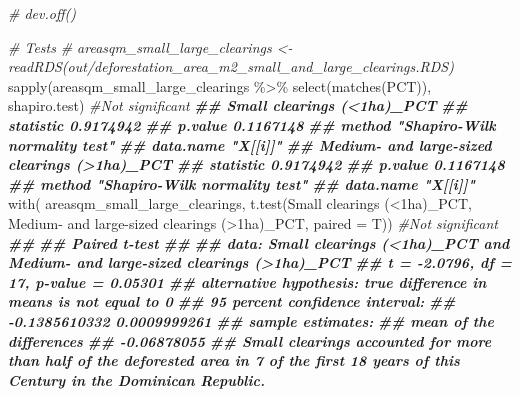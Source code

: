 \documentclass[10pt,landscape,a3paper]{article}
\newenvironment{Shaded}{\begin{snugshade}}{\end{snugshade}}
\newcommand{\AttributeTok}[1]{\textcolor[rgb]{0.77,0.63,0.00}{#1}}
\newcommand{\CommentTok}[1]{\textcolor[rgb]{0.56,0.35,0.01}{\textit{#1}}}
\newcommand{\DocumentationTok}[1]{\textcolor[rgb]{0.56,0.35,0.01}{\textbf{\textit{#1}}}}
\newcommand{\FunctionTok}[1]{\textcolor[rgb]{0.00,0.00,0.00}{#1}}
\newcommand{\NormalTok}[1]{#1}
\newcommand{\SpecialCharTok}[1]{\textcolor[rgb]{0.00,0.00,0.00}{#1}}
\newcommand{\StringTok}[1]{\textcolor[rgb]{0.31,0.60,0.02}{#1}}
\begin{document}
\begin{Shaded}
\begin{Highlighting}[]
\CommentTok{\# dev.off()}

\CommentTok{\# Tests}
\CommentTok{\# areasqm\_small\_large\_clearings \textless{}{-} readRDS(\textquotesingle{}out/deforestation\_area\_m2\_small\_and\_large\_clearings.RDS\textquotesingle{})}
\FunctionTok{sapply}\NormalTok{(areasqm\_small\_large\_clearings }\SpecialCharTok{\%\textgreater{}\%} \FunctionTok{select}\NormalTok{(}\FunctionTok{matches}\NormalTok{(}\StringTok{\textquotesingle{}PCT\textquotesingle{}}\NormalTok{)), shapiro.test) }\CommentTok{\#Not significant}
\DocumentationTok{\#\#           Small clearings (\textless{}1ha)\_PCT   }
\DocumentationTok{\#\# statistic 0.9174942                    }
\DocumentationTok{\#\# p.value   0.1167148                    }
\DocumentationTok{\#\# method    "Shapiro{-}Wilk normality test"}
\DocumentationTok{\#\# data.name "X[[i]]"                     }
\DocumentationTok{\#\#           Medium{-} and large{-}sized clearings (\textgreater{}1ha)\_PCT}
\DocumentationTok{\#\# statistic 0.9174942                                   }
\DocumentationTok{\#\# p.value   0.1167148                                   }
\DocumentationTok{\#\# method    "Shapiro{-}Wilk normality test"               }
\DocumentationTok{\#\# data.name "X[[i]]"}
\FunctionTok{with}\NormalTok{(}
\NormalTok{  areasqm\_small\_large\_clearings,}
  \FunctionTok{t.test}\NormalTok{(}\StringTok{\textasciigrave{}}\AttributeTok{Small clearings (\textless{}1ha)\_PCT}\StringTok{\textasciigrave{}}\NormalTok{, }\StringTok{\textasciigrave{}}\AttributeTok{Medium{-} and large{-}sized clearings (\textgreater{}1ha)\_PCT}\StringTok{\textasciigrave{}}\NormalTok{, }\AttributeTok{paired =}\NormalTok{ T)) }\CommentTok{\#Not significant}
\DocumentationTok{\#\# }
\DocumentationTok{\#\#  Paired t{-}test}
\DocumentationTok{\#\# }
\DocumentationTok{\#\# data:  Small clearings (\textless{}1ha)\_PCT and Medium{-} and large{-}sized clearings (\textgreater{}1ha)\_PCT}
\DocumentationTok{\#\# t = {-}2.0796, df = 17, p{-}value = 0.05301}
\DocumentationTok{\#\# alternative hypothesis: true difference in means is not equal to 0}
\DocumentationTok{\#\# 95 percent confidence interval:}
\DocumentationTok{\#\#  {-}0.1385610332  0.0009999261}
\DocumentationTok{\#\# sample estimates:}
\DocumentationTok{\#\# mean of the differences }
\DocumentationTok{\#\#             {-}0.06878055}
\DocumentationTok{\#\# Small clearings accounted for more than half of the deforested area in 7 of the first 18 years of this Century in the Dominican Republic. }


\end{Highlighting}
\end{Shaded}
\end{document}
